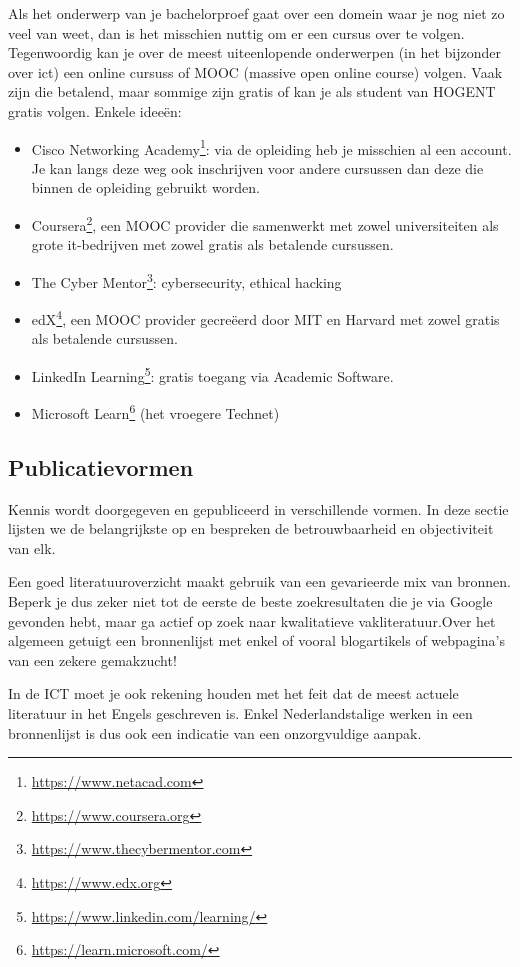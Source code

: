Als het onderwerp van je bachelorproef gaat over een domein waar je nog niet zo veel van weet, dan is het misschien nuttig om er een cursus over te volgen. Tegenwoordig kan je over de meest uiteenlopende onderwerpen (in het bijzonder over ict) een online cursuss of MOOC (massive open online course) volgen. Vaak zijn die betalend, maar sommige zijn gratis of kan je als student van HOGENT gratis volgen. Enkele ideeën:

\begin{itemize}
  \item Cisco Networking Academy\footnote{\url{https://www.netacad.com}}: via de opleiding heb je misschien al een account. Je kan langs deze weg ook inschrijven voor andere cursussen dan deze die binnen de opleiding gebruikt worden.
  \item Coursera\footnote{\url{https://www.coursera.org}}, een MOOC provider die samenwerkt met zowel universiteiten als grote it-bedrijven met zowel gratis als betalende cursussen.
  \item The Cyber Mentor\footnote{\url{https://www.thecybermentor.com}}: cybersecurity, ethical hacking
  \item edX\footnote{\url{https://www.edx.org}}, een MOOC provider gecreëerd door MIT en Harvard met zowel gratis als betalende cursussen.
  \item LinkedIn Learning\footnote{\url{https://www.linkedin.com/learning/}}: gratis toegang via Academic Software.
  \item Microsoft Learn\footnote{\url{https://learn.microsoft.com/}} (het vroegere Technet)
\end{itemize}

\subsection{Publicatievormen}%
\label{sub:publicatievormen}

Kennis wordt doorgegeven en gepubliceerd in verschillende vormen. In deze sectie lijsten we de belangrijkste op en bespreken de betrouwbaarheid en objectiviteit van elk.

Een goed literatuuroverzicht maakt gebruik van een gevarieerde mix van bronnen. Beperk je dus zeker niet tot de eerste de beste zoekresultaten die je via Google gevonden hebt, maar ga actief op zoek naar kwalitatieve vakliteratuur.Over het algemeen getuigt een bronnenlijst met enkel of vooral blogartikels of webpagina's van een zekere gemakzucht!

In de ICT moet je ook rekening houden met het feit dat de meest actuele literatuur in het Engels geschreven is. Enkel Nederlandstalige werken in een bronnenlijst is dus ook een indicatie van een onzorgvuldige aanpak.

